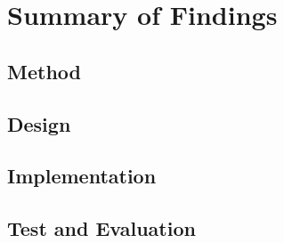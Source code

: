 \chapter{Summary of Findings}
\section{Method}
\section{Design}
\section{Implementation}
\section{Test and Evaluation}